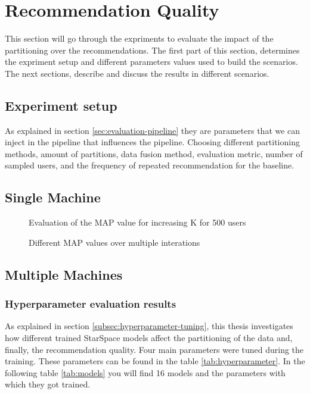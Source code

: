 \section{Recommendation Quality}
\label{sec:recommendation-quality}
This section will go through the expriments to evaluate the impact of the partitioning over the recommendations. The first part of this section, determines the expriment setup and different parameters values used to build the scenarios. The next sections, describe and discuss the results in different scenarios.


\subsection{Experiment setup}
\label{subsec:experiment-setup}
As explained in section \ref{sec:evaluation-pipeline} they are parameters that we can inject in the pipeline that influences the pipeline. Choosing different partitioning methods, amount of partitions, data fusion method, evaluation metric, number of sampled users, and the frequency of repeated recommendation for the baseline.


\subsection{Single Machine}
\label{subsec:eval-single-machine}

\begin{figure}[h!]
	\centering
	
	\caption{Evaluation of the MAP value for increasing K for 500 users}
	\label{plot:single-partition}
\end{figure}


\begin{figure}[h!]
	\centering
	
	\caption{Different MAP values over multiple interations}
	\label{plot:single-partition-boxplot}
\end{figure}

\subsection{Multiple Machines}
\label{subsec:eval-multiple-machines}

\subsubsection{Hyperparameter evaluation results}
\label{subsubsec:eval-hyperparameter}
As explained in section \ref{subsec:hyperparameter-tuning}, this thesis investigates how different trained StarSpace models affect the partitioning of the data and, finally, the recommendation quality. Four main parameters were tuned during the training. These parameters can be found in the table \ref{tab:hyperparameter}. In the following table \ref{tab:models} you will find 16 models and the parameters with which they got trained.


